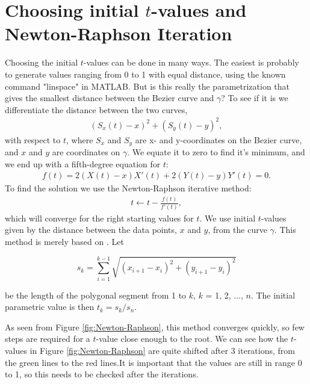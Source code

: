 \documentclass[10pt]{article}
\begin{document}
\section*{Choosing initial $t$-values and Newton-Raphson Iteration}

Choosing the initial $t$-values can be done in many ways. The easiest is probably to generate values ranging from 0 to 1 with equal distance, using the known command "linspace" in MATLAB. But is this really the parametrization that gives the smallest distance between the Bezier curve and $\gamma$? To see if it is we differentiate the distance between the two curves,
\begin{align}
(S_x(t) - x)^2 + (S_y(t) - y)^2,
\end{align}
with respect to $t$, where $S_x$ and $S_y$ are x- and y-coordinates on the Bezier curve, and $x$ and $y$ are coordinates on $\gamma$. We equate it to zero to find it's minimum, and we end up with a fifth-degree equation for $t$:
\begin{align}
f(t) =  2(X(t)-x)X'(t) + 2(Y(t)-y)Y'(t) = 0.
\end{align}
To find the solution we use the Newton-Raphson iterative method:
\begin{align}
t \gets t - \frac{f(t)}{f'(t)},
\end{align}
which will converge for the right starting values for $t$. We use initial $t$-values given by the distance between the data points, $x$ and $y$, from the curve $\gamma$. This method is merely based on \cite{Plass:1983}. Let

\begin{equation}
s_k = \sum_{i=1}^{k-1} \sqrt{(x_{i+1}-x_i)^2 + (y_{i+1}-y_i)^2}
\end{equation}

be the length of the polygonal segment from 1 to $k$, $k$ = 1, 2, ..., $n$. The initial parametric value is then $t_k = s_k/s_n$.

As seen from Figure \ref{fig:Newton-Raphson}, this method converges quickly, so few steps are required for a $t$-value close enough to the root. We can see how the $t$-values in Figure \ref{fig:Newton-Raphson} are quite shifted after 3 iterations, from the green lines to the red lines.It is important that the values are still in range 0 to 1, so this needs to be checked after the iterations. 
\end{document}
